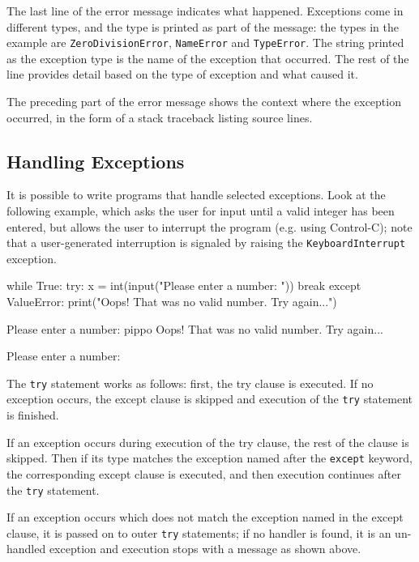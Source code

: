 The last line of the error message indicates what happened. Exceptions come in different types, and the type is printed as part of the message: the types in the example are \texttt{ZeroDivisionError}, \texttt{NameError} and \texttt{TypeError}. The string printed as the exception type is the name of the exception that occurred. The rest of the line provides detail based on the type of exception and what caused it.

The preceding part of the error message shows the context where the exception occurred, in the form of a stack traceback listing source lines.

\subsection{Handling Exceptions}
It is possible to write programs that handle selected exceptions. Look at the following example, which asks the user for input until a valid integer has been entered, but allows the user to interrupt the program (e.g. using Control-C); note that a user-generated interruption is signaled by raising the \texttt{KeyboardInterrupt} exception.

\begin{ipythonnon}
while True: 
    try:
        x = int(input("Please enter a number: ")) 
        break
    except ValueError:
        print("Oops! That was no valid number. Try again...")
\end{ipythonnon}
\begin{ioutput}
Please enter a number: pippo
Oops!  That was no valid number.  Try again...

Please enter a number:
\end{ioutput}

The \texttt{try} statement works as follows: first, the try clause is executed. If no exception occurs, the except clause is skipped and execution of the \texttt{try} statement is finished.

If an exception occurs during execution of the try clause, the rest of the clause is skipped. Then if its type matches the exception named after the \texttt{except} keyword, the corresponding except clause is executed, and then execution continues after the \texttt{try} statement.

If an exception occurs which does not match the exception named in the except clause, it is passed on to outer \texttt{try} statements; if no handler is found, it is an un-handled exception and execution stops with a message as shown above.

